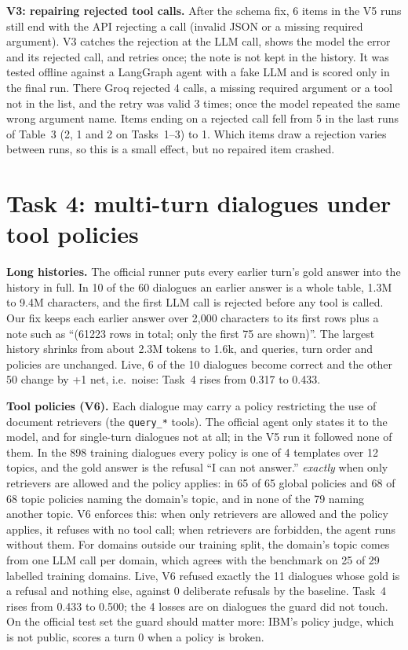 \documentclass[10pt]{article}
\begin{document}
\textbf{V3: repairing rejected tool calls.} After the schema fix, 6 items in the V5 runs still end
with the API rejecting a call (invalid JSON or a missing required argument). V3 catches the
rejection at the LLM call, shows the model the error and its rejected call, and retries once; the
note is not kept in the history. It was tested offline against a LangGraph agent with a fake LLM
and is scored only in the final run. There Groq rejected 4 calls, a missing required argument
or a tool not in the list, and the retry was valid 3 times; once the model repeated the same
wrong argument name. Items ending on a rejected call fell from 5 in the last runs of Table~3
(2, 1 and 2 on Tasks~1--3) to 1. Which items draw a rejection varies between runs, so this is
a small effect, but no repaired item crashed.

\section{Task 4: multi-turn dialogues under tool policies}

\textbf{Long histories.} The official runner puts every earlier turn's gold answer into the
history in full. In 10 of the 60 dialogues an earlier answer is a whole table, 1.3M to 9.4M
characters, and the first LLM call is rejected before any tool is called. Our fix keeps each
earlier answer over 2,000 characters to its first rows plus a note such as ``(61223 rows in
total; only the first 75 are shown)''. The largest history shrinks from about 2.3M tokens to
1.6k, and queries, turn order and policies are unchanged. Live, 6 of the 10 dialogues become
correct and the other 50 change by +1 net, i.e.\ noise: Task~4 rises from 0.317 to 0.433.

\textbf{Tool policies (V6).} Each dialogue may carry a policy restricting the use of document
retrievers (the \texttt{query\_*} tools). The official agent only states it to the model, and
for single-turn dialogues not at all; in the V5 run it followed none of them. In the 898
training dialogues every policy is one of 4 templates over 12 topics, and the gold answer is the
refusal ``I can not answer.'' \emph{exactly} when only retrievers are allowed and the policy
applies: in 65 of 65 global policies and 68 of 68 topic policies naming the domain's topic, and
in none of the 79 naming another topic. V6 enforces this: when only retrievers are allowed and
the policy applies, it refuses with no tool call; when retrievers are forbidden, the agent runs
without them. For domains outside our training split, the domain's topic comes from one LLM
call per domain, which agrees with the benchmark on 25 of 29 labelled training domains. Live,
V6 refused exactly the 11 dialogues whose gold is a refusal and nothing else, against 0
deliberate refusals by the baseline. Task~4 rises from 0.433 to 0.500; the 4 losses are on
dialogues the guard did not touch. On the official test set the guard should matter more:
IBM's policy judge, which is not public, scores a turn 0 when a policy is broken.
\end{document}

